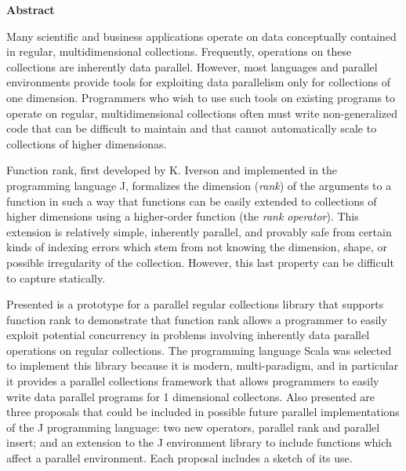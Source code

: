 \begin{center}

\bigskip

\begin{Large}
\textbf{\theTitle}
\end{Large}

\bigskip

\begin{large}
\theAuthor
\end{large}

\bigskip
\bigskip

\textbf{Abstract}

\end{center}

\noindent
Many scientific and business applications operate on 
data conceptually contained in regular, multidimensional collections.
Frequently, operations on these collections are inherently data parallel.
However, most languages and parallel environments 
provide tools for exploiting data parallelism only for collections of one dimension.
Programmers who wish to use such tools on existing programs to operate on regular, multidimensional collections
often must write non-generalized code that can be difficult to maintain and 
that cannot automatically scale to collections of higher dimensionas.

Function rank, first developed by K. Iverson and implemented in the programming language J, 
formalizes the dimension (\textit{rank}) of the arguments to a function in such a way 
that functions can be easily extended to collections of higher dimensions using 
a higher-order function (the \textit{rank operator}).
This extension is relatively simple, inherently parallel, and provably safe 
from certain kinds of indexing errors which stem from not knowing the dimension, shape, 
or possible irregularity of the collection.
However, this last property can be difficult to capture statically.

Presented is a prototype for a parallel regular collections library that supports function rank 
to demonstrate that function rank allows a programmer to easily exploit potential concurrency 
in problems involving inherently data parallel operations on regular collections.
The programming language Scala was selected to implement this library because it is modern, multi-paradigm, 
and in particular it provides a parallel collections framework that 
allows programmers to easily write data parallel programs for 1 dimensional collectons.
Also presented are three proposals that could be included in 
possible future parallel implementations of the J programming language:
two new operators, parallel rank and parallel insert;
and an extension to the J environment library to include functions which affect a parallel environment.
Each proposal includes a sketch of its use.

